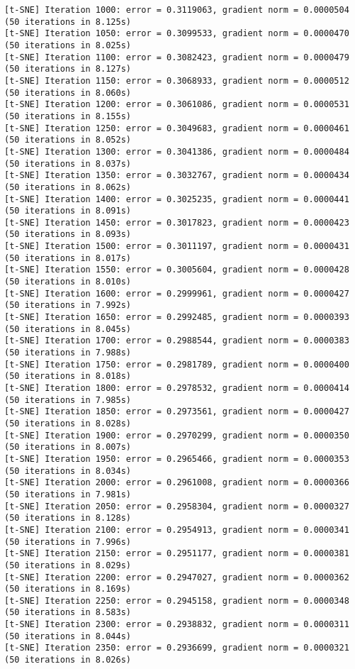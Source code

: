 \documentclass[11pt]{article}
\begin{document}
\begin{Verbatim}[commandchars=\\\{\}]
[t-SNE] Iteration 1000: error = 0.3119063, gradient norm = 0.0000504 (50 iterations in 8.125s)
[t-SNE] Iteration 1050: error = 0.3099533, gradient norm = 0.0000470 (50 iterations in 8.025s)
[t-SNE] Iteration 1100: error = 0.3082423, gradient norm = 0.0000479 (50 iterations in 8.127s)
[t-SNE] Iteration 1150: error = 0.3068933, gradient norm = 0.0000512 (50 iterations in 8.060s)
[t-SNE] Iteration 1200: error = 0.3061086, gradient norm = 0.0000531 (50 iterations in 8.155s)
[t-SNE] Iteration 1250: error = 0.3049683, gradient norm = 0.0000461 (50 iterations in 8.052s)
[t-SNE] Iteration 1300: error = 0.3041386, gradient norm = 0.0000484 (50 iterations in 8.037s)
[t-SNE] Iteration 1350: error = 0.3032767, gradient norm = 0.0000434 (50 iterations in 8.062s)
[t-SNE] Iteration 1400: error = 0.3025235, gradient norm = 0.0000441 (50 iterations in 8.091s)
[t-SNE] Iteration 1450: error = 0.3017823, gradient norm = 0.0000423 (50 iterations in 8.093s)
[t-SNE] Iteration 1500: error = 0.3011197, gradient norm = 0.0000431 (50 iterations in 8.017s)
[t-SNE] Iteration 1550: error = 0.3005604, gradient norm = 0.0000428 (50 iterations in 8.010s)
[t-SNE] Iteration 1600: error = 0.2999961, gradient norm = 0.0000427 (50 iterations in 7.992s)
[t-SNE] Iteration 1650: error = 0.2992485, gradient norm = 0.0000393 (50 iterations in 8.045s)
[t-SNE] Iteration 1700: error = 0.2988544, gradient norm = 0.0000383 (50 iterations in 7.988s)
[t-SNE] Iteration 1750: error = 0.2981789, gradient norm = 0.0000400 (50 iterations in 8.018s)
[t-SNE] Iteration 1800: error = 0.2978532, gradient norm = 0.0000414 (50 iterations in 7.985s)
[t-SNE] Iteration 1850: error = 0.2973561, gradient norm = 0.0000427 (50 iterations in 8.028s)
[t-SNE] Iteration 1900: error = 0.2970299, gradient norm = 0.0000350 (50 iterations in 8.007s)
[t-SNE] Iteration 1950: error = 0.2965466, gradient norm = 0.0000353 (50 iterations in 8.034s)
[t-SNE] Iteration 2000: error = 0.2961008, gradient norm = 0.0000366 (50 iterations in 7.981s)
[t-SNE] Iteration 2050: error = 0.2958304, gradient norm = 0.0000327 (50 iterations in 8.128s)
[t-SNE] Iteration 2100: error = 0.2954913, gradient norm = 0.0000341 (50 iterations in 7.996s)
[t-SNE] Iteration 2150: error = 0.2951177, gradient norm = 0.0000381 (50 iterations in 8.029s)
[t-SNE] Iteration 2200: error = 0.2947027, gradient norm = 0.0000362 (50 iterations in 8.169s)
[t-SNE] Iteration 2250: error = 0.2945158, gradient norm = 0.0000348 (50 iterations in 8.583s)
[t-SNE] Iteration 2300: error = 0.2938832, gradient norm = 0.0000311 (50 iterations in 8.044s)
[t-SNE] Iteration 2350: error = 0.2936699, gradient norm = 0.0000321 (50 iterations in 8.026s)

\end{Verbatim}
\end{document}
